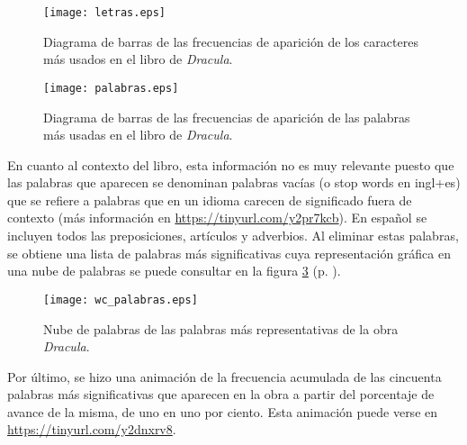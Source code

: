 \documentclass[paper=leter, fontsize=11pt]{scrartcl}
\numberwithin{equation}{section}		%
\numberwithin{figure}{section}			%
\numberwithin{table}{section}				%
\begin{document}
\begin{figure}
    \centering
    \texttt{[image: letras.eps]}
    \caption{Diagrama de barras de las frecuencias de aparición de los caracteres más usados en el libro de \textit{Dracula}.}
    \label{letras}
\end{figure}

\begin{figure}
    \centering
    \texttt{[image: palabras.eps]}
    \caption{Diagrama de barras de las frecuencias de aparición de las palabras más usadas en el libro de \textit{Dracula}.}
    \label{palabras}
\end{figure}

En cuanto al contexto del libro, esta información no es muy relevante puesto que las palabras que aparecen se denominan palabras vacías (o stop words en ingl+es) que se refiere a palabras que en un idioma carecen de significado fuera de contexto (más información en \url{https://tinyurl.com/y2pr7kcb}). En español se incluyen todos las preposiciones, artículos y adverbios. Al eliminar estas palabras, se obtiene una lista de palabras más significativas cuya representación gráfica en una nube de palabras se puede consultar en la figura \ref{wc_palabras} (p. \pageref{wc_palabras}).

\begin{figure}
    \centering
    \texttt{[image: wc\_palabras.eps]}
    \caption{Nube de palabras de las palabras más representativas de la obra \textit{Dracula}.}
    \label{wc_palabras}
\end{figure}

Por último, se hizo una animación de la frecuencia acumulada de las cincuenta palabras más significativas que aparecen en la obra a partir del porcentaje de avance de la misma, de uno en uno por ciento. Esta animación puede verse en \url{https://tinyurl.com/y2dnxrv8}.



\end{document}
